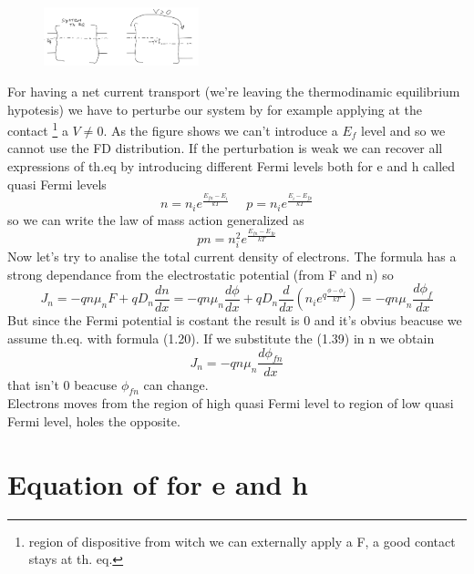 \begin{figure}
\includegraphics[width=0.4\textwidth]{perturbation.png}
\end{figure}

For having a net current transport (we're leaving the thermodinamic equilibrium hypotesis) we have to perturbe our system by for example applying at the contact \footnote{region of dispositive from witch we can externally apply a F, a good contact stays at th. eq.} a $V\neq 0$. 
As the figure shows  we can't introduce a $E_f$ level and so we cannot use the FD distribution. If the perturbation is weak we can recover all expressions of th.eq by introducing different Fermi levels both for e and h called quasi Fermi levels
\begin{equation}
n=n_ie^{\frac{E_{fn}-E_i}{kT}} \ \ \ \ \ \ p=n_ie^{\frac{E_i-E_{fp}}{kT}}
\end{equation}
so we can write the law of mass action generalized as 
\begin{equation}
pn=n_i^2e^{\frac{E_{fn}-E_{fp}}{kT}}
\end{equation}
Now let's try to analise the total current density of electrons. The formula has a strong dependance from the electrostatic potential (from F and n) so
\begin{equation}
J_n=-qn\mu_nF+qD_n\frac{dn}{dx}=-qn\mu_n\frac{d\phi}{dx}+qD_n\frac{d}{dx}\left(n_ie^{q\frac{\phi-\phi_f}{kT}}\right)=-qn\mu_n\frac{d\phi_f}{dx}
\end{equation} 
But since the Fermi potential is costant the result is 0 and it's obvius beacuse we assume th.eq. with formula (1.20).
If we substitute the (1.39) in n we obtain
\begin{equation}
J_n=-qn\mu_n\frac{d\phi_{fn}}{dx}
\end{equation}
that isn't 0 beacuse $\phi_{fn}$ can change.\\
Electrons moves from the region of high quasi Fermi level to region of low quasi Fermi level, holes the opposite.
\newline
\section{Equation of for e and h}

